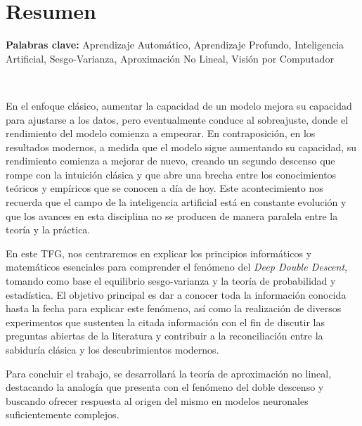 %

\chapter{Resumen}

\noindent\textbf{Palabras clave:} Aprendizaje Automático, Aprendizaje Profundo, Inteligencia Artificial, Sesgo-Varianza, Aproximación No Lineal, Visión por Computador

\

\begin{comment}
El aprendizaje automático, y en particular el aprendizaje profundo, se ha convertido en una herramienta fundamental en numerosos ámbitos, desempeñando un papel determinante al complementar e incluso reemplazar las labores humanas en diversos contextos. Sin embargo, el entrenamiento de estos modelos cada vez más complejos ha revelado, recientemente, comportamientos inesperados en su rendimiento, como el fenómeno conocido como \emph{Deep Double Descent}. Este fenómeno desafía la sabiduría clásica del aprendizaje, al evidenciar que la relación entre la complejidad del modelo y su rendimiento no siempre sigue las curvas esperadas por la teoría clásica.\newline
\end{comment}


En el enfoque clásico, aumentar la capacidad de un modelo mejora su capacidad para ajustarse a los datos, pero eventualmente conduce al sobreajuste, donde el rendimiento del modelo comienza a empeorar. En contraposición, en los resultados modernos, a medida que el modelo sigue aumentando su capacidad, su rendimiento comienza a mejorar de nuevo, creando un segundo descenso que rompe con la intuición clásica y que abre una brecha entre los conocimientos teóricos y empíricos que se conocen a día de hoy. Este acontecimiento nos recuerda que el campo de la inteligencia artificial está en constante evolución y que los avances en esta disciplina no se producen de manera paralela entre la teoría y la práctica.\newline

En este TFG, nos centraremos en explicar los principios informáticos y matemáticos esenciales para comprender el fenómeno del \emph{Deep Double Descent}, tomando como base el equilibrio sesgo-varianza y la teoría de probabilidad y estadística. El objetivo principal es dar a conocer toda la información conocida hasta la fecha para explicar este fenómeno, así como la realización de diversos experimentos que sustenten la citada información con el fin de discutir las preguntas abiertas de la literatura y contribuir a la reconciliación entre la sabiduría clásica y los descubrimientos modernos.\newline

Para concluir el trabajo, se desarrollará la teoría de aproximación no lineal, destacando la analogía que presenta con el fenómeno del doble descenso y buscando ofrecer respuesta al origen del mismo en modelos neuronales suficientemente complejos.\newline